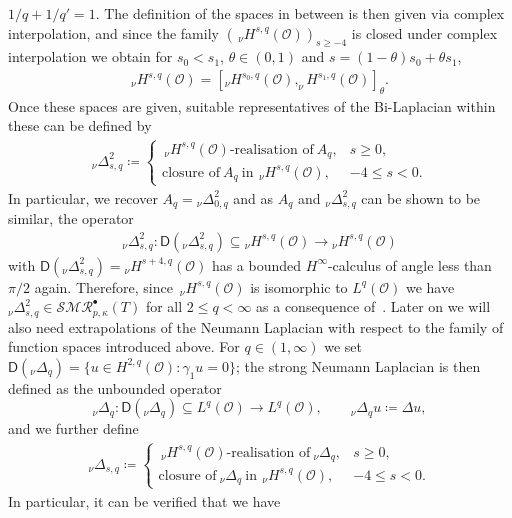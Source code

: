\documentclass[reqno]{amsart}
\newcommand{\sO}{\mathscr{O}}
\newcommand{\ce}{\coloneqq}
\newcommand{\seq}{\subseteq}
\newcommand{\1}{\mathbf{1}}
\newcommand{\nH}{\ensuremath{\,_\nu H}}
\begin{document}
$1/q+1/q'=1$. The definition of the spaces in between is then given via complex interpolation, and since the family $(\nH^{s, q}(\sO))_{s\geq - 4}$ is closed under complex interpolation we obtain for $s_0<s_1$, $\theta\in (0,1)$ and $s=(1-\theta)s_0+\theta s_1$,
\begin{align*}
 _\nu H^{ s, q}(\sO)  = [_\nu H^{s_0, q}(\sO),_\nu H^{s_1, q}(\sO)]_{\theta}.
\end{align*}
Once these spaces are given, suitable representatives of the Bi-Laplacian within these can be defined by  
\begin{align}
  _\nu\Delta_{s,q}^2   \ce \begin{cases}
        \nH^{ s, q}(\sO)\text{-realisation of} \ A_q, & s\geq 0,\\
        \text{closure of} \ A_q \ \text{in} \ \nH^{s, q}(\sO), & -4 \leq s<0.
    \end{cases}
\end{align}
In particular, we recover $A_q={_\nu\Delta_{0,q}^2}$ and as $A_q$ and 
$ _\nu\Delta_{s,q}^2$ can be shown to be similar, the operator 
\begin{align*}
     _\nu\Delta_{s,q}^2:\mathsf{D}(_\nu\Delta_{s,q}^2)\seq { _\nu H^{ s, q}(\sO)}\to{ _\nu H^{ s, q}(\sO)} 
\end{align*}
with $\mathsf{D}({_\nu \Delta_{s,q}^2})={_\nu H^{s+4, q}(\sO)}$ 
 has a bounded $H^\infty$-calculus of angle less than $\pi/2$ again. Therefore, since $\nH^{ s, q}(\sO)$ is isomorphic to $L^q(\sO)$ we have $_\nu \Delta_{s,q}^2\in \mathcal{SMR}_{p,\kappa}^\bullet(T)$ for all $2\leq q <\infty$ as a consequence of~\cite[Theorem~3.14]{agrestiNonlinearSPDEsMaximal2025}.
Later on we will also need extrapolations of the Neumann Laplacian 
with respect to the family of function spaces introduced above. For $q\in(1,\infty)$ we set $\mathsf D({}_\nu\Delta_q)=\{u\in H^{2,q}(\sO):\gamma_1 u=0\}$; the strong Neumann Laplacian is then defined as the unbounded operator
\[
{}_\nu\Delta_q\colon \mathsf D({}_\nu\Delta_q)\seq L^q(\sO)\to L^q(\sO)
,\qquad {}_\nu\Delta_q u\ce\Delta u,
\]
and we further define
\begin{align}
  _\nu\Delta_{s,q}   \ce \begin{cases}
        \nH^{ s, q}(\sO)\text{-realisation of} \ {}_\nu\Delta_q, & s\geq 0,\\
        \text{closure of} \ {}_\nu \Delta_q \ \text{in} \ \nH^{s, q}(\sO), & -4 \leq s<0.
    \end{cases}
\end{align}
In particular, it can be verified that we have 
\end{document}
